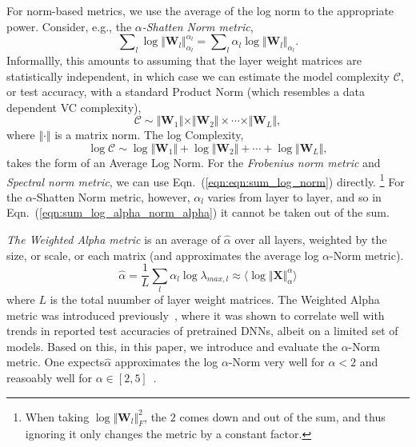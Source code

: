 For norm-based metrics, we use the average of the log norm to the appropriate power.
Consider, e.g., the \emph{$\alpha$-Shatten Norm metric}, 
\begin{equation}
\label{eqn:sum_log_alpha_norm_alpha}
\sum\nolimits_l \log \Vert\mathbf{W}_l\Vert_{\alpha_l}^{\alpha_l} 
=
\sum\nolimits_l \alpha_l \log \Vert\mathbf{W}_l\Vert_{\alpha_l} .
\end{equation}
Informallly, this amounts to assuming that the layer weight matrices are statistically independent, in which case we can estimate the model complexity $\mathcal{C}$, or test accuracy, with a standard Product Norm (which resembles a data dependent VC complexity),
\begin{equation}
\mathcal{C}\sim\Vert\mathbf{W}_{1}\Vert\times\Vert\mathbf{W}_{2}\Vert \times \cdots \times \Vert\mathbf{W}_{L}\Vert ,
\end{equation}
where $\Vert\cdot\Vert$ is a matrix norm.   
The log Complexity,
\begin{equation}
\label{eqn:eqn:sum_log_norm}
\log\mathcal{C} \sim \log\Vert\mathbf{W}_{1}\Vert+\log\Vert\mathbf{W}_{2}\Vert + \cdots + \log\Vert\mathbf{W}_{L}\Vert  ,
\end{equation}
 takes the form of an Average Log Norm.
For the \emph{Frobenius norm metric} and \emph{Spectral norm metric}, we can use Eqn.~(\ref{eqn:eqn:sum_log_norm}) directly. 
\footnote{When taking $\log\Vert\mathbf{W}_{l}\Vert_{F}^{2}$, the $2$ comes down and out of the sum, and thus ignoring it only changes the metric by a constant factor.}
For the $\alpha$-Shatten Norm metric, however, $\alpha_l$ varies from layer to layer, and so in Eqn.~(\ref{eqn:sum_log_alpha_norm_alpha}) it cannot be taken out of the sum.


\emph{The Weighted Alpha metric} is an average of $\hat{\alpha}$ over all layers, weighted by the size, or scale, or each matrix
(and approximates the average log $\alpha$-Norm metric).
\begin{equation}
\hat{\alpha} = \dfrac{1}{L}\sum_l \alpha_l\log\lambda_{max,l}\approx\langle\log\Vert\mathbf{X}\Vert_{\alpha}^{\alpha}\rangle  
\end{equation}
where $L$ is the total nuumber of layer weight matrices.
The Weighted Alpha metric was introduced previously~\cite{MM20_SDM}, where it was shown to correlate well with trends in reported test accuracies of pretrained DNNs, albeit on a limited set of models.
Based on this, in this paper, we introduce and evaluate the $\alpha$-Norm metric.
One expects$\hat{\alpha}$ approximates the log $\alpha$-Norm very well for $\alpha < 2$ and reasoably well for $\alpha\in[2,5]$~\cite{MM20_unpub_work}.  

